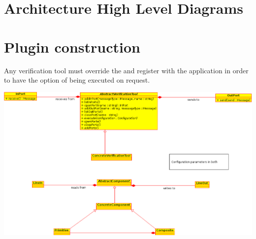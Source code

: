 \section{Architecture High Level Diagrams}



\section{Plugin construction}

Any verification tool must override the  
and register with the application in order to have the option
of being executed on request. 

\begin{center}
	\includegraphics[width=.9\linewidth]{PluginClassDiagram}
	\label{fig:plugin-class-diagram}
\end{center}

